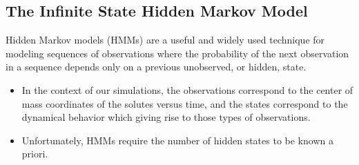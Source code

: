 \documentclass{article}
\begin{document}



  \subsection{The Infinite State Hidden Markov Model}
  
  Hidden Markov models (HMMs) are a useful and widely used technique
  for modeling sequences of observations where the probability of the next observation
  in a sequence depends only on a previous unobserved, or hidden, state.~\cite{beal_infinite_2002}
  \begin{itemize}
    \item In the context of our simulations, the observations correspond to 
    the center of mass coordinates of the solutes versus time, and the states
    correspond to the dynamical behavior which giving rise to those types
    of observations.
    \item Unfortunately, HMMs require the number of hidden states to be known
    a priori.
  \end{itemize}
  
\end{document}

